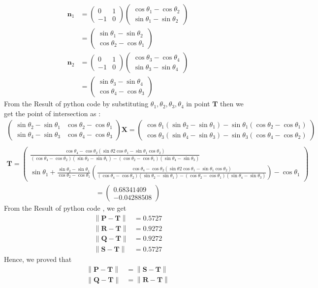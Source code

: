 \documentclass[10pt]{article}
\providecommand{\brak}[1]{\ensuremath{\left(#1\right)}}
\providecommand{\norm}[1]{\left\lVert#1\right\rVert}
\newcommand{\myvec}[1]{\ensuremath{\begin{pmatrix}#1\end{pmatrix}}}
\let\vec\mathbf
\begin{document}
\begin{enumerate}
\begin{align}
\vec{n}_1&=\myvec{0&1\\-1&0}\myvec{\cos \theta_1-\cos \theta_2\\\sin \theta_1-\sin \theta_2}\\
&=\myvec{\sin \theta_1-\sin \theta_2\\\cos \theta_2-\cos \theta_1}\\
\vec{n}_2&=\myvec{0&1\\-1&0}\myvec{\cos\theta_3-\cos \theta_4\\\sin \theta_3-\sin \theta_4}\\
&=\myvec{\sin \theta_3-\sin \theta_4\\\cos \theta_4-\cos \theta_3}
\end{align}
From the Result of python code by substituting $\theta_1,\theta_2,\theta_3,\theta_4$ in point $\vec{T}$ then we get the point of intersection as :
\begin{multline}
\myvec{\sin \theta_2-\sin \theta_1&\cos \theta_2-\cos \theta_1\\\sin \theta_4-\sin \theta_3&\cos \theta_4-\cos \theta_3}\vec{X}=\myvec{\cos \theta_1\brak{\sin \theta_2-\sin \theta_1}-\sin \theta_1\brak{\cos \theta_2-\cos \theta_1}\\\cos \theta_3\brak{\sin \theta_4-\sin \theta_3}-\sin \theta_3\brak{\cos \theta_4-\cos \theta_2}}\\
\end{multline}
\begin{multline}
\vec{T}=\myvec{\frac{\cos \theta_4-\cos \theta_2\brak{\sin \theta2 \cos \theta_1-\sin \theta_1 \cos \theta_2}}{\brak{\cos\theta_4-\cos \theta_2}\brak{\sin \theta_2-\sin \theta_1}-\brak{\cos \theta_2-\cos \theta_1}\brak{\sin \theta_4-\sin \theta_3}}\\[8pt]\sin \theta_1+\frac{\sin \theta_2-\sin \theta_1}{\cos \theta_2-\cos \theta_1}\brak{\frac{\cos \theta_4-\cos \theta_2\brak{\sin \theta2\cos \theta_1-\sin \theta_1\cos \theta_2}}{\brak{\cos \theta_4-\cos \theta_2}\brak{\sin \theta_2-\sin \theta_1}-\brak{\cos \theta_2-\cos \theta_1}\brak{\sin \theta_4-\sin \theta_3}}}-\cos \theta_1}
\end{multline} 	
\begin{align}
=\myvec{0.68341409\\-0.04288508}
\end{align}
From the Result of python code , we get
\begin{align}
\norm{\vec{P}-\vec{T}}&=0.5727\\
\norm{\vec{R}-\vec{T}}&=0.9272\\
\norm{\vec{Q}-\vec{T}}&=0.9272\\
\norm{\vec{S}-\vec{T}}&=0.5727
\end{align}
Hence, we proved that
\begin{align}
\norm{\vec{P}-\vec{T}}&=\norm{\vec{S}-\vec{T}}\\
\norm{\vec{Q}-\vec{T}}&=\norm{\vec{R}-\vec{T}}
\end{align} 
\end{enumerate}
\end{document}
